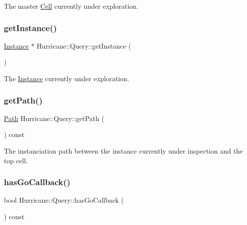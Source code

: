 The master \hyperlink{classHurricane_1_1Cell}{Cell} currently under exploration. \mbox{\label{classHurricane_1_1Query_a459b9f175f77fce91963eeb192c6e018}} 
\subsubsection{\texorpdfstring{get\+Instance()}{getInstance()}}
{\footnotesize\ttfamily \hyperlink{classHurricane_1_1Instance}{Instance} $\ast$ Hurricane\+::\+Query\+::get\+Instance (\begin{DoxyParamCaption}{ }\end{DoxyParamCaption})\hspace{0.3cm}{\ttfamily [inline]}}

The \hyperlink{classHurricane_1_1Instance}{Instance} currently under exploration. \mbox{\label{classHurricane_1_1Query_ae6be93b35a9174b2e7b656853f450021}} 
\subsubsection{\texorpdfstring{get\+Path()}{getPath()}}
{\footnotesize\ttfamily \hyperlink{classHurricane_1_1Path}{Path} Hurricane\+::\+Query\+::get\+Path (\begin{DoxyParamCaption}{ }\end{DoxyParamCaption}) const\hspace{0.3cm}{\ttfamily [inline]}}

The instanciation path between the instance currently under inspection and the top cell. \mbox{\label{classHurricane_1_1Query_aeff0c9c1ef8b787a3f1460ea55db2947}} 
\subsubsection{\texorpdfstring{has\+Go\+Callback()}{hasGoCallback()}}
{\footnotesize\ttfamily bool Hurricane\+::\+Query\+::has\+Go\+Callback (\begin{DoxyParamCaption}{ }\end{DoxyParamCaption}) const\hspace{0.3cm}{\ttfamily [virtual]}}

